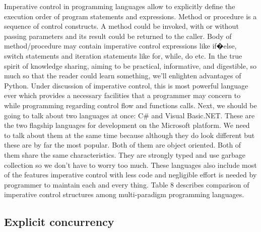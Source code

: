 \documentclass{sig-alternate}
\begin{document}
	Imperative control in programming languages allow to explicitly define the execution order of program statements and expressions. Method or procedure is a sequence of control constructs. A method could be invoked, with or without passing parameters and its result could be returned to the caller. Body of method/procedure may contain imperative control expressions like if�else, switch statements and iteration statements like for, while, do etc.
	\newline
	In the true spirit of knowledge sharing, aiming to be practical, informative, and digestible, so much so that the reader could learn something, we'll enlighten advantages of Python. Under discussion of imperative control, this is most powerful language ever which provides a necessary facilities that a programmer may concern to while programming regarding control flow and functions calls. Next, we should be going to talk about two languages at once: C\# and Visual Basic.NET. These are the two flagship languages for development on the Microsoft platform. We need to talk about them at the same time because although they do look different but these are by far the most popular. Both of them are object oriented. Both of them share the same characteristics. They are strongly typed and use garbage collection so we don't have to worry too much. These languages also include most of the features imperative control with less code and negligible effort is needed by programmer to maintain each and every thing. Table 8 describes comparison of imperative control structures among multi-paradigm programming languages. 
	
	
	\subsection{Explicit concurrency}
	
\end{document}
